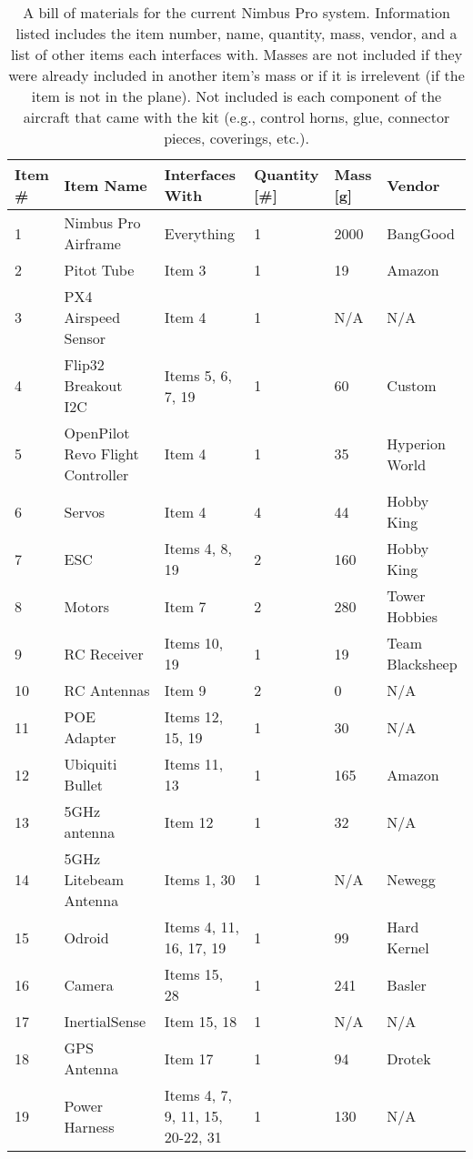 \documentclass[]{auvsi_doc}
\begin{document}
	\begin{table}[h!]
		\begin{center}
			\caption{A bill of materials for the current Nimbus Pro system. Information listed includes the item number, name, quantity, mass, vendor, and a list of other items each interfaces with. Masses are not included if they were already included in another item's mass or if it is irrelevent (if the item is not in the plane). Not included is each component of the aircraft that came with the kit (e.g., control horns, glue, connector pieces, coverings, etc.).}
			\label{table:BOM}
			\begin{tabular}{p{1cm}p{4cm}p{3cm}p{1.5cm}p{1cm}p{2.5cm}}
				\toprule
				Item \# & Item Name & Interfaces With & Quantity [\#] & Mass [g] & Vendor \\
				\midrule
				1 & Nimbus Pro Airframe & Everything & 1 & 2000 & BangGood   \\
				2 & Pitot Tube & Item 3 & 1 & 19 & Amazon \\
				3 & PX4 Airspeed Sensor & Item 4 & 1 & N/A & N/A \\
				4 & Flip32 Breakout I2C & Items 5, 6, 7, 19 & 1 & 60 & Custom \\
				5 & OpenPilot Revo \newline Flight Controller & Item 4 & 1 & 35 & Hyperion \newline World  \\
				6 & Servos & Item 4 & 4 & 44 & Hobby King \\
				7 & ESC & Items 4, 8, 19 & 2 & 160 & Hobby King \\
				8 & Motors & Item 7 & 2 & 280 & Tower \newline Hobbies \\
				9 & RC Receiver & Items 10, 19 & 1 & 19 & Team \newline Blacksheep \\
				10 & RC Antennas & Item 9 & 2 & 0 & N/A \\
				11 & POE Adapter & Items 12, 15, 19 & 1 & 30 & N/A \\
				12 & Ubiquiti Bullet & Items 11, 13 & 1 & 165 & Amazon \\
				13 & 5GHz antenna & Item 12 & 1 & 32 & N/A \\
				14 & 5GHz Litebeam \newline Antenna & Items 1, 30 & 1 & N/A & Newegg\\
				15 & Odroid & Items 4, 11, 16, 17, 19 & 1 & 99 & Hard Kernel \\
				16 & Camera & Items 15, 28 & 1 & 241 & Basler \\
				17 & InertialSense & Item 15, 18 & 1 & N/A & N/A \\
				18 & GPS Antenna & Item 17 & 1 & 94 & Drotek \\
				19 & Power Harness & Items 4, 7, 9, 11, 15, 20-22, 31 & 1 & 130 & N/A \\
				\bottomrule
			\end{tabular}
		\end{center}
	\end{table}
\end{document}
